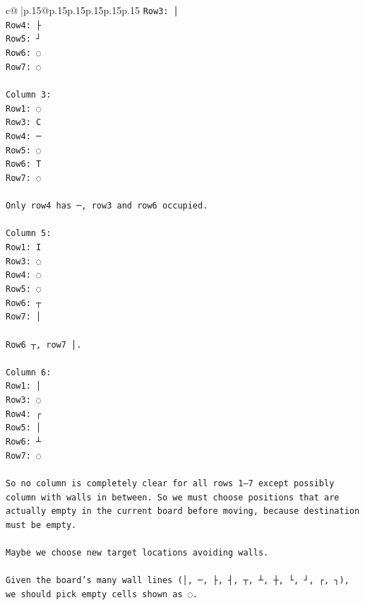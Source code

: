 \documentclass{article}
\begin{document}
{\begin{supertabular}{c@{$\;$}|p{.15\linewidth}@{}p{.15\linewidth}p{.15\linewidth}p{.15\linewidth}p{.15\linewidth}p{.15\linewidth}}
{{{\texttt{Row3: │  } \\
\texttt{Row4: ├  } \\
\texttt{Row5: ┘  } \\
\texttt{Row6: ◌  } \\
\texttt{Row7: ◌  } \\
\\ 
\texttt{Column 3:  } \\
\texttt{Row1: ◌  } \\
\texttt{Row3: C  } \\
\texttt{Row4: ─  } \\
\texttt{Row5: ◌  } \\
\texttt{Row6: T  } \\
\texttt{Row7: ◌  } \\
\\ 
\texttt{Only row4 has ─, row3 and row6 occupied.} \\
\\ 
\texttt{Column 5:  } \\
\texttt{Row1: I  } \\
\texttt{Row3: ◌  } \\
\texttt{Row4: ◌  } \\
\texttt{Row5: ◌  } \\
\texttt{Row6: ┬  } \\
\texttt{Row7: │  } \\
\\ 
\texttt{Row6 ┬, row7 │.} \\
\\ 
\texttt{Column 6:  } \\
\texttt{Row1: │  } \\
\texttt{Row3: ◌  } \\
\texttt{Row4: ┌  } \\
\texttt{Row5: │  } \\
\texttt{Row6: ┴  } \\
\texttt{Row7: ◌  } \\
\\ 
\texttt{So no column is completely clear for all rows 1–7 except possibly column with walls in between. So we must choose positions that are actually empty in the current board before moving, because destination must be empty.} \\
\\ 
\texttt{Maybe we choose new target locations avoiding walls.} \\
\\ 
\texttt{Given the board's many wall lines (│, ─, ├, ┤, ┬, ┴, ┼, └, ┘, ┌, ┐), we should pick empty cells shown as ◌.} \\
}}}
\end{supertabular}}
\end{document}
